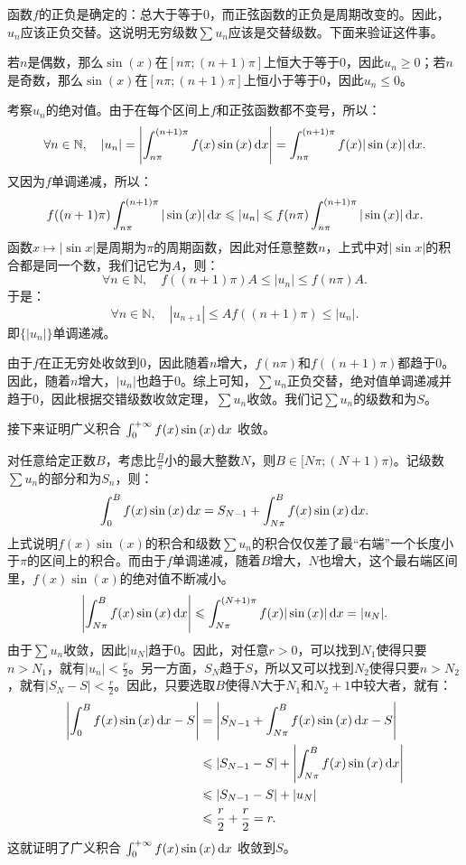 \documentclass[12pt,UTF8,fontset=none]{ctexbook}
\begin{document}
\begin{so}
    函数$f$的正负是确定的：总大于等于$0$，而正弦函数的正负是周期改变的。因此，$u_n$应该正负交替。这说明无穷级数$\sum u_n$应该是交替级数。下面来验证这件事。

    若$n$是偶数，那么$\sin{(x)}$在$[n\pi;(n+1)\pi]$上恒大于等于$0$，因此$u_n\geqslant 0$；若$n$是奇数，那么$\sin{(x)}$在$[n\pi;(n+1)\pi]$上恒小于等于$0$，因此$u_n\leqslant 0$。

    考察$u_n$的绝对值。由于在每个区间上$f$和正弦函数都不变号，所以：
    $$ \forall n\in \mathbb{N},\quad |u_n| = \left|\int_{n\pi}^{(n+1)\pi} f(x) \sin{(x)} \,\mathrm{d}x\right| = \int_{n\pi}^{(n+1)\pi} f(x) |\sin{(x)}| \,\mathrm{d}x. $$
    又因为$f$单调递减，所以：
    $$ f((n+1)\pi)\int_{n\pi}^{(n+1)\pi} |\sin{(x)}| \,\mathrm{d}x \leqslant |u_n| \leqslant f(n\pi)\int_{n\pi}^{(n+1)\pi} |\sin{(x)}| \,\mathrm{d}x. $$
    函数$x\mapsto |\sin{x}|$是周期为$\pi$的周期函数，因此对任意整数$n$，上式中对$|\sin{x}|$的积合都是同一个数，我们记它为$A$，则：
    $$ \forall n\in \mathbb{N},\quad f((n+1)\pi)A \leqslant |u_n| \leqslant f(n\pi)A. $$
    于是：
    $$ \forall n\in \mathbb{N},\quad |u_{n+1}| \leqslant A f((n+1)\pi) \leqslant |u_n|. $$
    即$\{|u_n|\}$单调递减。

    由于$f$在正无穷处收敛到$0$，因此随着$n$增大，$f(n\pi)$和$f((n+1)\pi)$都趋于$0$。因此，随着$n$增大，$|u_n|$也趋于$0$。综上可知，$\sum u_n$正负交替，绝对值单调递减并趋于$0$，因此根据交错级数收敛定理，$\sum u_n$收敛。我们记$\sum u_n$的级数和为$S$。

    接下来证明广义积合 $\int_0^{+\infty} f(x) \sin{(x)} \,\mathrm{d}x$ 收敛。

    对任意给定正数$B$，考虑比$\frac{B}{\pi}$小的最大整数$N$，则$B\in [N\pi;(N+1)\pi)$。记级数$\sum u_n$的部分和为$S_n$，则：
    $$ \int_0^{B} f(x) \sin{(x)} \,\mathrm{d}x = S_{N-1} + \int_{N\pi}^{B} f(x) \sin{(x)} \,\mathrm{d}x. $$
    上式说明$f(x) \sin{(x)}$的积合和级数$\sum u_n$的积合仅仅差了最“右端”一个长度小于$\pi$的区间上的积合。而由于$f$单调递减，随着$B$增大，$N$也增大，这个最右端区间里，$f(x) \sin{(x)}$的绝对值不断减小。
    $$ \left| \int_{N\pi}^{B} f(x) \sin{(x)} \,\mathrm{d}x \right| \leqslant \int_{N\pi}^{(N+1)\pi} f(x)| \sin{(x)}| \,\mathrm{d}x = |u_N|. $$
    由于$\sum u_n$收敛，因此$|u_N|$趋于$0$。因此，对任意$r>0$，可以找到$N_1$使得只要$n>N_1$，就有$|u_n| < \frac{r}{2}$。另一方面，$S_N$趋于$S$，所以又可以找到$N_2$使得只要$n>N_2$，就有$|S_N - S| < \frac{r}{2}$。因此，只要选取$B$使得$N$大于$N_1$和$N_2+1$中较大者，就有：
    \begin{align*}
        \left| \int_0^{B} f(x) \sin{(x)} \,\mathrm{d}x - S \right| &= \left| S_{N-1} + \int_{N\pi}^{B} f(x) \sin{(x)} \,\mathrm{d}x - S \right| \\
        &\leqslant |S_{N-1} - S| + \left| \int_{N\pi}^{B} f(x) \sin{(x)} \,\mathrm{d}x \right|\\
        &\leqslant |S_{N-1} - S| + |u_N| \\
        &\leqslant \frac{r}{2} + \frac{r}{2} = r.
    \end{align*}
    这就证明了广义积合 $\int_0^{+\infty} f(x) \sin{(x)} \,\mathrm{d}x$ 收敛到$S$。


\end{so}
\end{document}
